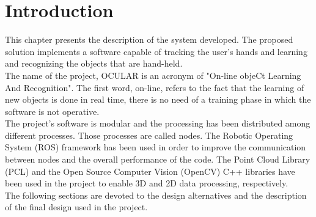 \section{Introduction}

This chapter presents the description of the system developed.
The proposed solution implements a software capable of tracking the user's hands and learning and recognizing the objects that are hand-held. 
\\

The name of the project, OCULAR is an acronym of "On-line objeCt Learning And Recognition". 
The first word, on-line, refers to the fact that the learning of new objects is done in real time, there is no need of a training phase in which the software is not operative. 
\\


The project's software is modular and the processing has been distributed among different processes.
Those processes are called nodes.  
The Robotic Operating System (ROS) framework has been used in order to improve the communication between nodes and the overall performance of the code. The Point Cloud Library (PCL) and 
the Open Source Computer Vision (OpenCV) C++ libraries have been used in the project to enable 3D and 2D data processing, respectively. 
\\
The following sections are devoted to the design alternatives and the description of the final design used in the project. 